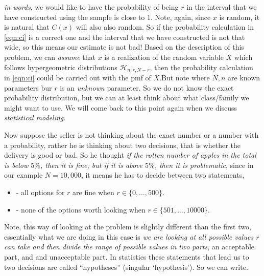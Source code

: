 \documentclass[ 11pt,%
				a4paper,%
				twoside,%
				headinclude,%
				footinclude = true,%
				cleardoublepage = empty,%
				reqno]{scrbook}
\begin{document}
\begin{example}
        \textit{in words}, we would like to have the probability of being $r$ in the interval that we have constructed using the sample is close to $1$. Note, again, since $x$ is random, it is natural that $C(x)$ will also also random. So if the probability calculation in \cref{eqn:ci} is a correct one and the interval that we have constructed is not that wide, so this means our estimate is not bad! Based on the description of this problem, we can \emph{assume} that $x$ is a realization of the random variable $X$ which follows hypergeometric distributions $\mathcal{H}_{n ; r, N-r}$, then the probability calculation in \cref{eqn:ci} could be carried out with the pmf of $X$.But note where $N, n$ are known parameters bur $r$ is an \emph{unknown} parameter. So we do not know the exact probability distribution, but we can at least think about what class/family we might want to use. We will come back to this point again when we discuss \emph{statistical modeling}.


         

\textbf{}

    Now suppose the seller is not thinking about the exact number or a number with a probability, rather he is thinking about two decisions, that is whether the delivery is good or bad. So he thought \emph{if the rotten number of apples in the total is below $5\%$, then it is fine, but if it is above $5\%$, then it is problematic}, since in our example $N = 10,000$, it means he has to decide between two statements, 

    \begin{itemize}
        \item[] - all options for $r$ are fine when $r \in\{0, \ldots, 500\}$.

        \item[] - none of the options worth looking when $r \in\{501, \ldots, 10000\}$.
    \end{itemize}


     Note, this way of looking at the problem is slightly different than the first two, essentially what we are doing in this case is \emph{we are looking at all possible values $r$ can take and then divide the range of possible values in two parts}, an acceptable part, and and unacceptable part. In statistics these statements that lead us to two decisions are called ``hypotheses'' (singular `hypothesis'). So we can write.


\end{example}
\end{document}
